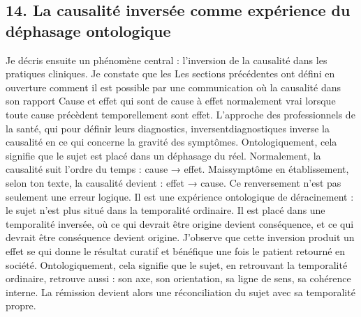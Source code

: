 \documentclass[12pt,letterpaper,oneside]{article}
\begin{document}
\subsection*{14. La causalité inversée comme expérience du déphasage ontologique}
Je décris ensuite un phénomène central : l’inversion de la causalité dans les pratiques cliniques. Je constate que les
Les sections précédentes ont défini en ouverture comment il est possible par une communication où la causalité dans son rapport Cause et effet qui sont de cause à effet normalement vrai lorsque toute cause précèdent temporellement sont effet. L’approche des professionnels de la santé, qui pour définir leurs diagnostics, inversentdiagnostiques inverse la causalité en ce qui concerne la gravité des symptômes. Ontologiquement, cela signifie que le sujet est placé dans un déphasage du réel.
Normalement, la causalité suit l’ordre du temps : cause → effet.
Maissymptôme en établissement, selon ton texte, la causalité devient : effet → cause.
Ce renversement n’est pas seulement une erreur logique. Il est une expérience ontologique de déracinement : le sujet n’est plus situé dans la temporalité ordinaire. Il est placé dans une temporalité inversée, où ce qui devrait être origine devient conséquence, et ce qui devrait être conséquence devient origine.
J’observe que cette inversion produit un effet se qui donne le résultat curatif et bénéfique une fois le patient retourné en société. Ontologiquement, cela signifie que le sujet, en retrouvant la temporalité ordinaire, retrouve aussi :
	son axe,
	son orientation,
	sa ligne de sens,
	sa cohérence interne.
La rémission devient alors une réconciliation du sujet avec sa temporalité propre.
\end{document}
